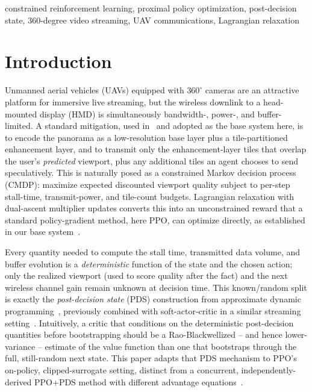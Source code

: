 \documentclass[conference]{IEEEtran}
\begin{document}
\begin{IEEEkeywords}
constrained reinforcement learning, proximal policy optimization, post-decision state,
360-degree video streaming, UAV communications, Lagrangian relaxation
\end{IEEEkeywords}

\section{Introduction}

Unmanned aerial vehicles (UAVs) equipped with $360^{\circ}$ cameras are an attractive
platform for immersive live streaming, but the wireless downlink to a head-mounted
display (HMD) is simultaneously bandwidth-, power-, and buffer-limited. A standard
mitigation, used in~\cite{ref_mmsp25} %
and adopted as the base system here, is to encode the panorama as a low-resolution
base layer plus a tile-partitioned enhancement layer, and to transmit only the
enhancement-layer tiles that overlap the user's \emph{predicted} viewport, plus any
additional tiles an agent chooses to send speculatively. This is naturally posed as a
constrained Markov decision process (CMDP): maximize expected discounted viewport
quality subject to per-step stall-time, transmit-power, and tile-count budgets.
Lagrangian relaxation with dual-ascent multiplier updates converts this into an
unconstrained reward that a standard policy-gradient method, here PPO, can optimize
directly, as established in our base system~\cite{ref_mmsp25}.

Every quantity needed to compute the stall time, transmitted data volume, and
buffer evolution is a \emph{deterministic} function of the state and the chosen
action; only the realized viewport (used to score quality after the fact) and the
next wireless channel gain remain unknown at decision time. This known/random
split is exactly the \emph{post-decision state} (PDS) construction from approximate
dynamic programming~\cite{powell_adp}, previously combined with soft-actor-critic in
a similar streaming setting~\cite{ref_ehs}. %
Intuitively, a critic that conditions on the deterministic post-decision quantities
before bootstrapping should be a Rao-Blackwellized -- and hence lower-variance --
estimate of the value function than one that bootstraps through the full, still-random
next state. This paper adapts that PDS mechanism to PPO's on-policy, clipped-surrogate
setting, distinct from a concurrent, independently-derived PPO+PDS method with different
advantage equations~\cite{felizardo2025pds}.
\end{document}
